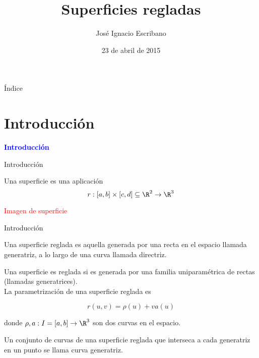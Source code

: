 \documentclass[10pt]{beamer}
\author{José Ignacio Escribano}
\title{Superficies regladas}
\date{23 de abril de 2015}
\institute[URJC]{\texttt{[image: logoURJC.jpg]}}
\begin{document}
	\begin{frame}[plain]
		\maketitle
	\end{frame}
	
	\begin{frame}{Índice}
		\tableofcontents
	\end{frame}
	
	
	\section{Introducción}
	
	\begin{frame}
		\begin{center}
			\Huge\textbf{\textsf{\textcolor{blue}{Introducción}}}
		\end{center}
	\end{frame}
	
	
	\begin{frame}{Introducción}
		\begin{defi}
			Una superficie es una aplicación
			\begin{equation}
			r : [a,b] \times [c,d] \subseteq \R^2 \to \R^3
			\end{equation}
		\end{defi}
		
		\begin{ejemplo}[de superficie]
			\textcolor{red}{Imagen de superficie}
		\end{ejemplo}	
	\end{frame}
	
	\begin{frame}{Introducción}
		\begin{defi}
			Una superficie reglada es aquella generada por una recta en el espacio llamada generatriz, a lo largo de una curva llamada directriz.
		\end{defi}	
		
		\begin{defi}
			Una superficie es reglada si es generada por una familia uniparamétrica de rectas (llamadas generatrices).\\
			
			La parametrización de una superficie reglada es 
			
			\begin{equation}
			r(u,v) = \rho(u) + v a(u)
			\end{equation}
			
			donde $\rho, a : I = [a,b] \to \R^3$ son dos curvas en el espacio.
		\end{defi}
		
		\begin{defi}
			Un conjunto de curvas de una superficie reglada que interseca a cada generatriz en un punto se llama curva generatriz.
		\end{defi}	
		
	\end{frame}
	
\end{document}
